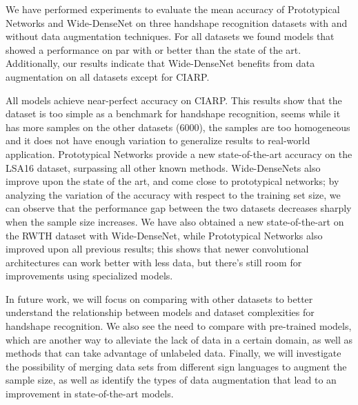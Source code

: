 We have performed experiments to evaluate the mean accuracy of Prototypical Networks and Wide-DenseNet on three handshape recognition datasets with and without data augmentation techniques.
For all datasets we found models that showed a performance on par  with or better than the state of the art.  Additionally, our results indicate that Wide-DenseNet benefits from data augmentation on all datasets except for CIARP.

 All models achieve near-perfect accuracy on CIARP.  This results show that  the dataset is too simple  as a benchmark for handshape recognition, seems while it has more samples on the other datasets (6000),  the samples are too  homogeneous and it does not have enough variation to generalize results to real-world application. Prototypical Networks  provide a new state-of-the-art accuracy on the LSA16  dataset,  surpassing all other known methods. Wide-DenseNets  also improve upon the state of the art,  and come close  to prototypical networks; by analyzing  the  variation of the accuracy  with respect to the training set size,  we can observe that  the performance gap between the two datasets  decreases sharply when the sample size increases.  We  have also obtained a new state-of-the-art on the RWTH  dataset  with Wide-DenseNet,  while Prototypical Networks also improved upon all previous results; this shows that  newer convolutional architectures can work better with  less data,  but there's still room for improvements using specialized models.

In future work, we  will focus on comparing with other datasets  to better understand the relationship between models and dataset complexities for handshape recognition.  We also see the need to compare with pre-trained models,  which are another way to alleviate the lack of data in a certain domain,  as well as methods that can  take advantage of unlabeled data.  Finally,  we will investigate the possibility of  merging data sets from different sign languages to augment the sample size,   as well as identify the types of data  augmentation that lead to  an improvement in state-of-the-art models.
